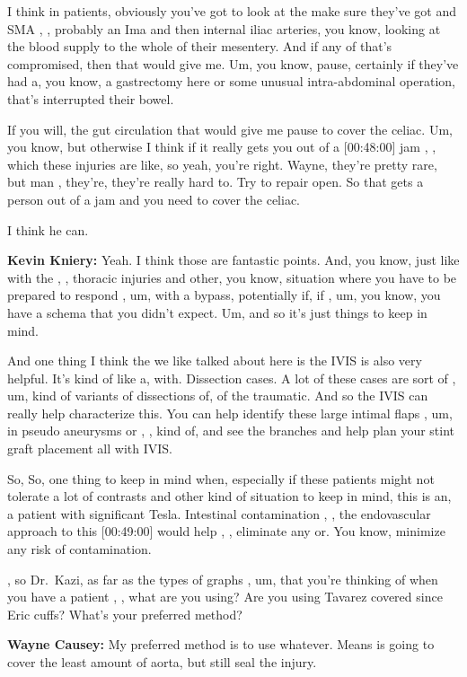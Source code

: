 \documentclass[
]{book}
\begin{document}
I think in patients, obviously you've got to look at the make sure
they've got and SMA , , probably an Ima and then internal iliac
arteries, you know, looking at the blood supply to the whole of their
mesentery. And if any of that's compromised, then that would give me.
Um, you know, pause, certainly if they've had a, you know, a gastrectomy
here or some unusual intra-abdominal operation, that's interrupted their
bowel.

If you will, the gut circulation that would give me pause to cover the
celiac. Um, you know, but otherwise I think if it really gets you out of
a {[}00:48:00{]} jam , , which these injuries are like, so yeah, you're
right. Wayne, they're pretty rare, but man , they're, they're really
hard to. Try to repair open. So that gets a person out of a jam and you
need to cover the celiac.

I think he can.

\textbf{Kevin Kniery:} Yeah. I think those are fantastic points. And, you
know, just like with the , , thoracic injuries and other, you know,
situation where you have to be prepared to respond , um, with a bypass,
potentially if, if , um, you know, you have a schema that you didn't
expect. Um, and so it's just things to keep in mind.

And one thing I think the we like talked about here is the IVIS is also
very helpful. It's kind of like a, with. Dissection cases. A lot of
these cases are sort of , um, kind of variants of dissections of, of the
traumatic. And so the IVIS can really help characterize this. You can
help identify these large intimal flaps , um, in pseudo aneurysms or , ,
kind of, and see the branches and help plan your stint graft placement
all with IVIS.

So, So, one thing to keep in mind when, especially if these patients
might not tolerate a lot of contrasts and other kind of situation to
keep in mind, this is an, a patient with significant Tesla. Intestinal
contamination , , the endovascular approach to this {[}00:49:00{]} would
help , , eliminate any or. You know, minimize any risk of contamination.

, so Dr.~Kazi, as far as the types of graphs , um, that you're thinking
of when you have a patient , , what are you using? Are you using Tavarez
covered since Eric cuffs? What's your preferred method?

\textbf{Wayne Causey:} My preferred method is to use whatever. Means is going
to cover the least amount of aorta, but still seal the injury.
\end{document}

